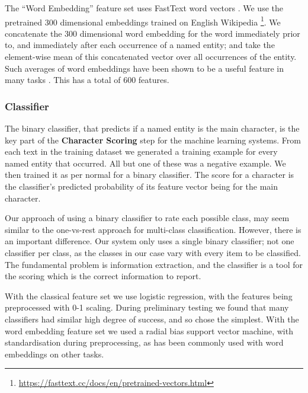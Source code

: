 \documentclass[]{book}
\begin{document}
The ``Word Embedding'' feature set uses FastText word vectors \parencite{bojanowski2016enriching}.
We use the pretrained 300 dimensional embeddings trained on English Wikipedia \footnote{\url{https://fasttext.cc/docs/en/pretrained-vectors.html}}.
We concatenate the 300 dimensional word embedding for the word immediately prior to, and immediately after each occurrence of a named entity;
and take the element-wise mean of this concatenated vector over all occurrences of the  entity.
Such averages of word embeddings have been shown to be a useful feature in many tasks \parencite{White2015SentVecMeaning,mikolovSkip}.
This has a total of 600 features.

\subsubsection{Classifier}
The binary classifier, that predicts if a named entity is the main character, is the key part of the \textbf{Character Scoring} step for the machine learning systems.
From each text in the training dataset
we generated a training example for every named entity that occurred.
All but one of these was a negative example.
We then trained it as per normal for a binary classifier.
The score for a character is the classifier's predicted probability of its feature vector being for the main character.

Our approach of using a binary classifier to rate each possible class,
may seem similar to the one-vs-rest approach for multi-class classification.
However, there is an important difference.
Our system only uses a single binary classifier; not one classifier per class,
as the classes in our case vary with every item to be classified.
The fundamental problem is information extraction, and the classifier is a tool for the scoring which is the correct information to report.


With the classical feature set we use logistic regression, with the features being preprocessed with 0-1 scaling.
During preliminary testing we found that many classifiers had similar high degree of success, and so chose the simplest.
With the word embedding feature set we used a radial bias support vector machine, with  standardisation during preprocessing,
as has been commonly used with word embeddings on other tasks.
\end{document}
